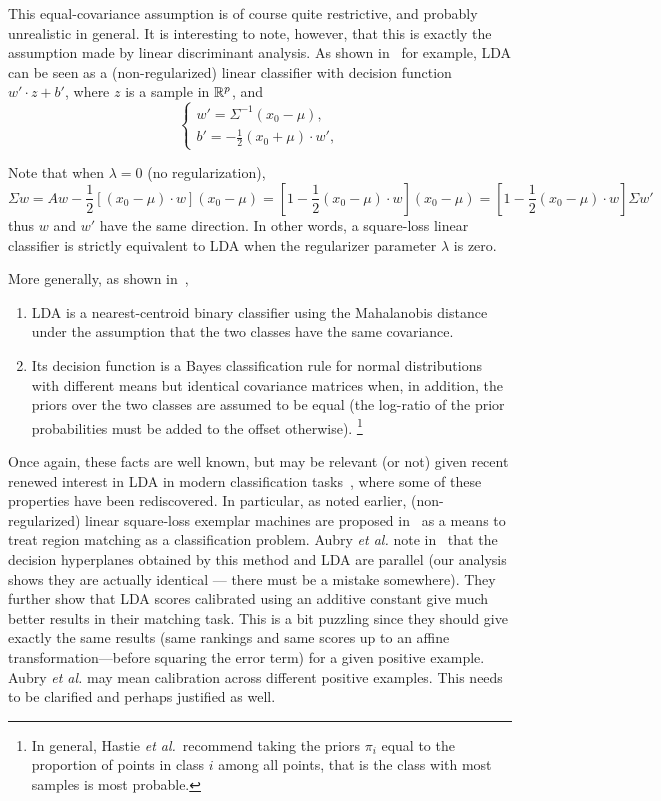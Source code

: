 \documentclass[12pt,letterpaper]{article}
\begin{document}
This equal-covariance assumption is of course quite restrictive, and
probably unrealistic in general. It is interesting to note, however,
that this is exactly the assumption made by linear discriminant
analysis. As shown in~\cite{Hastie2009} for example, LDA can be seen as a
(non-regularized) linear classifier
with decision function $w'\cdot z+ b'$, where $z$ is a sample in
$\mathbb{R}^p$, and
\begin{equation}
\left\{\begin{array}{l}
\displaystyle w'=\Sigma^{-1}(x_0-\mu),\\
\displaystyle b'=-\frac{1}{2}(x_0+\mu)\cdot w',
\end{array}\right.
\label{eq:lda}
\end{equation}

Note that when $\lambda=0$ (no regularization),
\begin{equation}
\Sigma w = Aw -\frac{1}{2}[(x_0-\mu)\cdot w] (x_0-\mu) =
[1-\frac{1}{2}(x_0-\mu)\cdot w](x_0-\mu)
=[1-\frac{1}{2}(x_0-\mu)\cdot w]\Sigma w'
\end{equation}
thus $w$ and $w'$ have the same direction. In other words, a
square-loss linear classifier is strictly equivalent to LDA when the
regularizer parameter $\lambda $ is zero.

More generally, as shown in~\cite{Hastie2009}, 
\begin{enumerate}
\item LDA is a nearest-centroid binary classifier using the
 Mahalanobis distance under the assumption that the two classes
have the same covariance.
\item Its decision function is a Bayes classification rule for normal
distributions with different means but identical covariance matrices
when, in addition, the priors over the two classes are assumed to be
equal (the log-ratio of the prior probabilities must be added to the
offset otherwise). \footnote{In general, Hastie
{\em et al.}~recommend taking the priors $\pi_i$ equal to the proportion of points
in class $i$ among all points, that is the class with most samples is
most probable.}
\end{enumerate}

Once again, these facts are well known, but may be relevant (or not)
given recent renewed interest in LDA in modern classification
tasks~\cite{GMPD12,HMR12}, where some of these properties have been
rediscovered. In particular, as noted earlier, (non-regularized)
linear square-loss exemplar machines are proposed in~\cite{ARS14} as a
means to treat region matching as a classification problem. Aubry {\em
et al.} note in~\cite{ARS14} that the decision hyperplanes obtained by
this method and LDA are parallel (our analysis shows they are actually
identical --- there must be a mistake somewhere). They further show
that LDA scores calibrated using an additive constant give much better
results in their matching task. This is a bit puzzling since they
should give exactly the same results (same rankings and same scores up
to an affine transformation---before squaring the error term) for a
given positive example. Aubry {\em et al.} may mean calibration across
different positive examples. This needs to be clarified and perhaps
justified as well.
\end{document}
